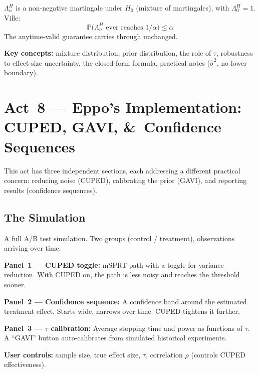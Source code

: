 \documentclass[12pt, a4paper]{article}
\newcommand{\Prob}{\mathbb{P}}         %
\newcommand{\LR}{\Lambda}              %
\begin{document}
$\LR_n^{H}$ is a non-negative martingale under $H_0$ (mixture of
martingales), with $\LR_0^{H} = 1$.  Ville:
\[
  \boxed{\Prob\bigl(\LR_n^{H} \text{ ever reaches } 1/\alpha\bigr) \leq \alpha}
\]
The anytime-valid guarantee carries through unchanged.

\begin{keytakeaway}
\textbf{Key concepts:} mixture distribution, prior distribution, the role of
$\tau$, robustness to effect-size uncertainty, the closed-form formula,
practical notes ($\hat\sigma^2$, no lower boundary).
\end{keytakeaway}


\newpage
\section{Act~8 --- Eppo's Implementation: CUPED, GAVI, \&\ Confidence
         Sequences}

This act has three independent sections, each addressing a different practical
concern: reducing noise (CUPED), calibrating the prior (GAVI), and reporting
results (confidence sequences).

\subsection{The Simulation}

\begin{simulation}
A full A/B test simulation.  Two groups (control / treatment), observations
arriving over time.

\textbf{Panel~1 --- CUPED toggle:}
mSPRT path with a toggle for variance reduction.  With CUPED on, the path is
less noisy and reaches the threshold sooner.

\textbf{Panel~2 --- Confidence sequence:}
A confidence band around the estimated treatment effect.  Starts wide, narrows
over time.  CUPED tightens it further.

\textbf{Panel~3 --- $\tau$ calibration:}
Average stopping time and power as functions of $\tau$.  A ``GAVI'' button
auto-calibrates from simulated historical experiments.

\textbf{User controls:} sample size, true effect size, $\tau$, correlation
$\rho$ (controls CUPED effectiveness).
\end{simulation}
\end{document}
